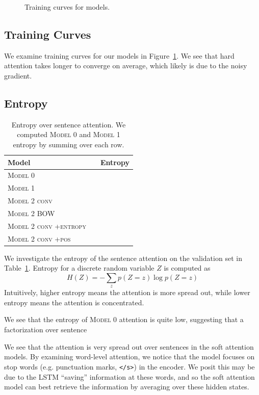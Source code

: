 \documentclass[12pt]{report}
\begin{document}
\begin{figure}
\caption{Training curves for models.} %
\label{fig:train_curves}
\end{figure}


\subsection{Training Curves} We examine training curves for our models in Figure~\ref{fig:train_curves}. We see that hard attention takes longer to converge on average, which likely is due to the noisy gradient.




\subsection{Entropy}

\begin{table}[t]
\centering
\begin{tabular}{llr}
\toprule
Model & & Entropy \\
\midrule
\textsc{Model 0} \\
\textsc{Model 1} \\
\textsc{Model 2 conv} \\
\textsc{Model 2 BOW} \\
\textsc{Model 2 conv +entropy}  \\
\textsc{Model 2 conv +pos} \\
\bottomrule
\end{tabular}
\caption{Entropy over sentence attention. We computed \textsc{Model 0} and \textsc{Model 1} entropy by summing over each row.}
\label{table:entropy}
\end{table}

We investigate the entropy of the sentence attention on the validation set in Table~\ref{table:entropy}. Entropy for a discrete random variable $Z$ is computed as
$$H(Z) = -\sum_{z} p(Z = z) \log p(Z = z)$$
Intuitively, higher entropy means the attention is more spread out, while lower entropy means the attention is concentrated.

We see that the entropy of \textsc{Model 0} attention is quite low, suggesting that a factorization over sentence




We see that the attention is very spread out over sentences in the soft attention models. By examining word-level attention, we notice that the model focuses on stop words (e.g. punctuation marks, \texttt{</s>}) in the encoder. We posit this may be due to the LSTM ``saving'' information at these words, and so the soft attention model can best retrieve the information by averaging over these hidden states.
\end{document}
